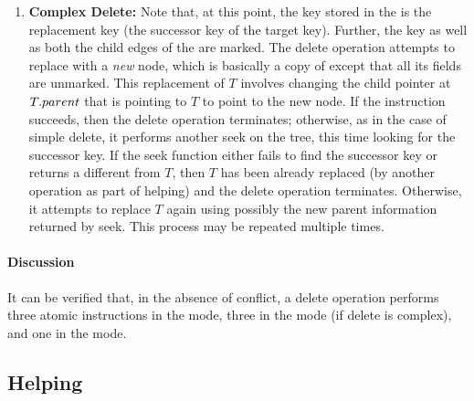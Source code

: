 \begin{limitscope}
\begin{enumerate}[leftmargin=*, label=(\alph*), noitemsep]
\item \textbf{Complex Delete:}
Note that, at this point, the key stored in the \targetnode{} is the replacement key (the successor key of the target key). Further, the key as well as both the child edges of the \targetnode{} are marked. The delete operation attempts to replace \targetnode{} with a \emph{new} node, which is basically a copy of \targetnode{} except that all its fields are unmarked. This replacement of $T$ involves changing the child pointer at $T.parent$ that is pointing to $T$ to point to the new node. If the \CAS{} instruction succeeds, then the delete operation terminates; otherwise, as in the case of simple delete, it performs another seek on the tree, this time looking for the successor key. If the seek function either fails to find the successor key or returns a \terminalnode{} different from $T$, then $T$ has been already replaced (by another operation as part of helping) and the delete operation terminates. Otherwise, it attempts to replace $T$ again using possibly the new parent information returned by seek. This process may be repeated multiple times.
\end{enumerate}

\paragraph*{Discussion}
It can be verified that, in the absence of conflict, a delete operation performs three atomic instructions in the \injection{} mode, three in the \discovery{} mode (if delete is complex), and one in the \cleanup{} mode. 

\begin{comment}


\subsection{Additional validation during seek}




During seek we maintain two seek records: current and previous seek records. This is to prevent the scenario shown in Fig.~\ref{fig:issueInSeek}.

\end{comment}

\subsection{Helping}


\end{limitscope}
